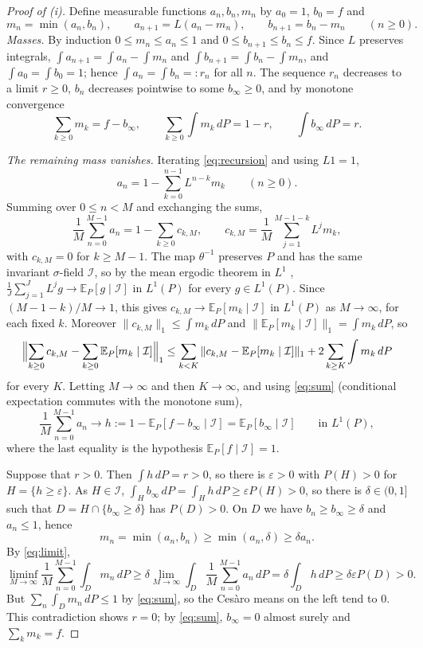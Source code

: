 \documentclass[11pt]{amsart}
\theoremstyle{remark}
\numberwithin{equation}{section}
\newcommand{\E}{\mathbb E}
\newcommand{\I}{\mathcal I}
\begin{document}
\begin{proof}[Proof of \textup{(i)}]
Define measurable functions $a_n,b_n,m_n$ by $a_0=1$, $b_0=f$ and
\begin{equation}\label{eq:recursion}
m_n=\min(a_n,b_n),\qquad a_{n+1}=L(a_n-m_n),\qquad b_{n+1}=b_n-m_n\qquad(n\ge0).
\end{equation}
\emph{Masses.} By induction $0\le m_n\le a_n\le1$ and $0\le b_{n+1}\le b_n\le f$. Since $L$ preserves integrals, $\int a_{n+1}=\int a_n-\int m_n$ and $\int b_{n+1}=\int b_n-\int m_n$, and $\int a_0=\int b_0=1$; hence $\int a_n=\int b_n=:r_n$ for all $n$. The sequence $r_n$ decreases to a limit $r\ge0$, $b_n$ decreases pointwise to some $b_\infty\ge0$, and by monotone convergence
\begin{equation}\label{eq:sum}
\sum_{k\ge0}m_k=f-b_\infty,\qquad \sum_{k\ge0}\int m_k\,dP=1-r,\qquad \int b_\infty\,dP=r .
\end{equation}

\emph{The remaining mass vanishes.} Iterating \eqref{eq:recursion} and using $L1=1$,
\[
a_n=1-\sum_{k=0}^{n-1}L^{n-k}m_k\qquad(n\ge0).
\]
Summing over $0\le n<M$ and exchanging the sums,
\begin{equation}\label{eq:cesaro}
\frac1M\sum_{n=0}^{M-1}a_n=1-\sum_{k\ge0}c_{k,M},\qquad c_{k,M}=\frac1M\sum_{j=1}^{M-1-k}L^jm_k ,
\end{equation}
with $c_{k,M}=0$ for $k\ge M-1$. The map $\theta^{-1}$ preserves $P$ and has the same invariant $\sigma$-field $\I$, so by the mean ergodic theorem in $L^1$ \cite[Chapter~10]{Ka}, $\frac1J\sum_{j=1}^{J}L^jg\to\E_P[g\mid\I]$ in $L^1(P)$ for every $g\in L^1(P)$. Since $(M-1-k)/M\to1$, this gives $c_{k,M}\to\E_P[m_k\mid\I]$ in $L^1(P)$ as $M\to\infty$, for each fixed $k$. Moreover $\|c_{k,M}\|_1\le\int m_k\,dP$ and $\|\E_P[m_k\mid\I]\|_1=\int m_k\,dP$, so
\[
\Bigl\|\sum_{k\ge0}c_{k,M}-\sum_{k\ge0}\E_P[m_k\mid\I]\Bigr\|_1\le\sum_{k<K}\|c_{k,M}-\E_P[m_k\mid\I]\|_1+2\sum_{k\ge K}\int m_k\,dP
\]
for every $K$. Letting $M\to\infty$ and then $K\to\infty$, and using \eqref{eq:sum} (conditional expectation commutes with the monotone sum),
\begin{equation}\label{eq:limit}
\frac1M\sum_{n=0}^{M-1}a_n\longrightarrow h:=1-\E_P[f-b_\infty\mid\I]=\E_P[b_\infty\mid\I]\qquad\text{in }L^1(P),
\end{equation}
where the last equality is the hypothesis $\E_P[f\mid\I]=1$.

Suppose that $r>0$. Then $\int h\,dP=r>0$, so there is $\varepsilon>0$ with $P(H)>0$ for $H=\{h\ge\varepsilon\}$. As $H\in\I$, $\int_Hb_\infty\,dP=\int_Hh\,dP\ge\varepsilon P(H)>0$, so there is $\delta\in(0,1]$ such that $D=H\cap\{b_\infty\ge\delta\}$ has $P(D)>0$. On $D$ we have $b_n\ge b_\infty\ge\delta$ and $a_n\le1$, hence
\[
m_n=\min(a_n,b_n)\ge\min(a_n,\delta)\ge\delta a_n .
\]
By \eqref{eq:limit},
\[
\liminf_{M\to\infty}\frac1M\sum_{n=0}^{M-1}\int_Dm_n\,dP\ge\delta\lim_{M\to\infty}\int_D\frac1M\sum_{n=0}^{M-1}a_n\,dP=\delta\int_Dh\,dP\ge\delta\varepsilon P(D)>0 .
\]
But $\sum_n\int_Dm_n\,dP\le1$ by \eqref{eq:sum}, so the Ces\`aro means on the left tend to $0$. This contradiction shows $r=0$; by \eqref{eq:sum}, $b_\infty=0$ almost surely and $\sum_km_k=f$.


\end{proof}
\end{document}
